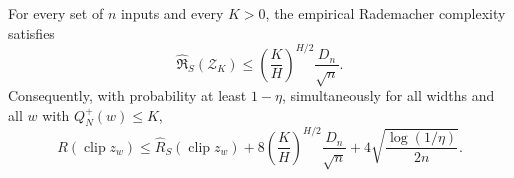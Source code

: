 \begin{lemma}
\label{lem:gaussian-capacity}
For every set of $n$ inputs and every $K>0$, the empirical Rademacher
complexity satisfies
\begin{equation}
 \widehat{\mathfrak R}_S(\mathcal Z_K)
 \leq \left(\frac KH\right)^{H/2}\frac{D_n}{\sqrt n}.
 \label{eq:gaussian-rademacher}
\end{equation}
Consequently, with probability at least $1-\eta$, simultaneously for all
widths and all $w$ with $Q_N^+(w)\leq K$,
\begin{equation}
 R(\operatorname{clip}z_w)
 \leq\widehat R_S(\operatorname{clip}z_w)
 +8\left(\frac KH\right)^{H/2}\frac{D_n}{\sqrt n}
 +4\sqrt{\frac{\log(1/\eta)}{2n}}.
 \label{eq:gaussian-fixed-energy-deviation}
\end{equation}
\end{lemma}
